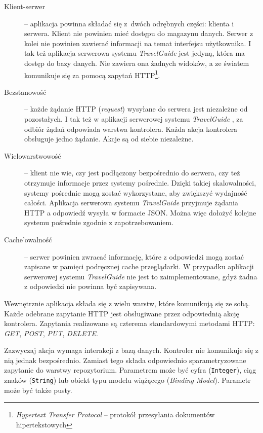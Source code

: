 \documentclass{book}
\newcommand{\appName}{\emph{TravelGuide} }
\begin{document}
			\begin{description}
				
				\item[Klient-serwer] -- aplikacja powinna składać się z~dwóch odrębnych części: klienta i serwera. Klient nie powinien mieć dostępu do magazynu danych. Serwer z kolei nie powinien zawierać informacji na temat interfejsu użytkownika. I tak też aplikacja serwerowa systemu \appName jest jedyną, która ma dostęp do bazy danych. Nie zawiera ona żadnych widoków, a ze światem 				komunikuje się za pomocą zapytań HTTP\footnote{\emph{Hypertext Transfer Protocol} – protokół przesyłania dokumentów hipertekstowych}.
				\item[Bezstanowość] -- każde żądanie HTTP (\emph{request}) wysyłane do serwera jest niezależne od pozostałych. I tak też w aplikacji serwerowej systemu \appName, za odbiór żądań odpowiada warstwa kontrolera. Każda akcja kontrolera obsługuje jedno żądanie. Akcje są od siebie niezależne.
				\item[Wielowarstwowość] -- klient nie wie, czy jest podłączony bezpośrednio do serwera, czy też otrzymuje informacje przez systemy pośrednie. Dzięki takiej skalowalności, systemy pośrednie mogą zostać wykorzystane, aby zwiększyć wydajność całości. Aplikacja serwerowa systemu \appName przyjmuje żądania HTTP a odpowiedź wysyła w formacie JSON. Można więc dołożyć kolejne systemu pośrednie zgodnie z zapotrzebowaniem. 
				\item[Cache'owalność] --  %
				serwer powinien zwracać informację, które z odpowiedzi mogą zostać zapisane w pamięci podręcznej cache przeglądarki. W przypadku aplikacji serwerowej systemu \appName nie jest to zaimplementowane, gdyż żadna z odpowiedzi nie powinna być zapisywana.
				
			\end{description}
			
			Wewnętrznie aplikacja składa się z wielu warstw, które komunikują się ze sobą. Każde odebrane zapytanie HTTP jest obsługiwane przez odpowiednią akcję kontrolera. Zapytania realizowane są czterema standardowymi metodami HTTP: \emph{GET}, \emph{POST}, \emph{PUT}, \emph{DELETE}.
			
			Zazwyczaj akcja wymaga interakcji z bazą danych. Kontroler nie komunikuje się z nią jednak bezpośrednio. Zamiast tego składa odpowiednio sparametryzowane zapytanie do warstwy repozytorium. Parametrem może być cyfra (\texttt{Integer}), ciąg znaków (\texttt{String}) lub obiekt typu modelu wiążącego (\emph{Binding Model}). Parametr może być także pusty. 
			
\end{document}
